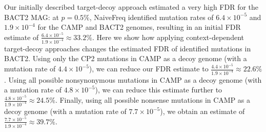 Our initially described target-decoy approach estimated a very high FDR for the BACT2 MAG:
at $p = 0.5\%$, NaiveFreq identified mutation rates of $6.4 \times 10^{-5}$ and $1.9 \times 10^{-4}$ for the CAMP and BACT2 genomes, resulting in an initial FDR estimate of $\frac{6.4 \times 10^{-5}}{1.9 \times 10^{-4}} \approx 33.2\%$.
%
Here we show how applying context-dependent target-decoy approaches changes the estimated FDR of identified mutations in BACT2.
%
Using only the CP2 mutations in CAMP as a decoy genome (with a mutation rate of $4.4 \times 10^{-5}$), we can reduce our FDR estimate to $\frac{4.4 \times 10^{-5}}{1.9 \times 10^{-4}} \approx 22.6\%$.
%
Using all possible nonsynonymous mutations in CAMP as a decoy genome (with a mutation rate of $4.8 \times 10^{-5}$), we can reduce this estimate further to $\frac{4.8 \times 10^{-5}}{1.9 \times 10^{-4}} \approx 24.5\%$.
%
Finally, using all possible nonsense mutations in CAMP as a decoy genome (with a mutation rate of $7.7 \times 10^{-5}$), we obtain an estimate of $\frac{7.7 \times 10^{-5}}{1.9 \times 10^{-4}} \approx 39.7\%$.
\endinput